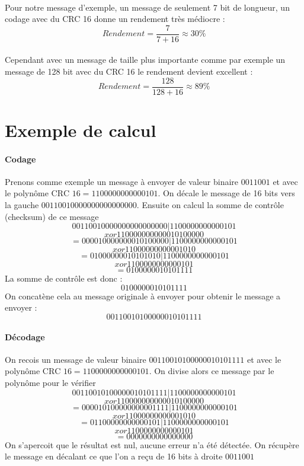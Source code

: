         \paragraph{}
Pour notre message d'exemple, un message de seulement 7 bit de longueur, un codage avec du CRC 16 donne un rendement très médiocre :
\[  Rendement = \frac{7}{7 + 16} \approx 30\%  \]
        \paragraph{}
Cependant avec un message de taille plus importante comme par exemple un message de 128 bit avec du CRC 16 le rendement devient excellent :
\[  Rendement = \frac{128}{128 + 16} \approx 89\%  \]


    \section{Exemple de calcul}
        \paragraph{Codage}
Prenons comme exemple un message à envoyer de valeur binaire $ 0011001 $
et avec le polynôme $ \text{CRC 16} = 1100000000000101 $.
On décale le message de 16 bits vers la gauche $ 00110010000000000000000 $.
Ensuite on calcul la somme de contrôle (checksum) de ce message
\[ 00110010000000000000000 | 1100000000000101 \]
\[ xor 110000000000010100000 \]
\[ = 000010000000010100000 | 1100000000000101 \]
\[ xor 11000000000001010 \]
\[ = 01000000010101010 | 1100000000000101 \]
\[ xor 1100000000000101 \]
\[ = 0100000010101111 \]
La somme de contrôle est donc :
\[ 0100000010101111 \]
On concatène cela au message originale à envoyer pour obtenir le message a envoyer :
\[ 00110010100000010101111 \]
        \paragraph{Décodage}
On recois un message de valeur binaire $ 00110010100000010101111 $
et avec le polynôme $ \text{CRC 16} = 1100000000000101 $.
On divise alors ce message par le polynôme pour le vérifier
\[ 00110010100000010101111 | 1100000000000101 \]
\[ xor 110000000000010100000 \]
\[ = 000010100000000001111 | 1100000000000101 \]
\[ xor 11000000000001010 \]
\[ = 01100000000000101 | 1100000000000101 \]
\[ xor 1100000000000101 \]
\[ = 0000000000000000 \]
On s'apercoit que le résultat est nul, aucune erreur n'a été détectée.
On récupère le message en décalant ce que l'on a reçu de 16 bits à droite $ 0011001 $

